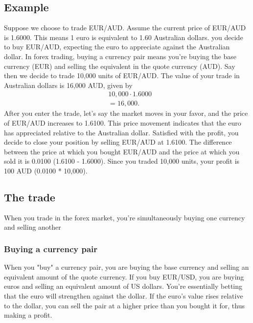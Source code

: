 \documentclass{report}
\begin{document}
    \subsection{Example}
    \bigbreak \noindent 
    Suppose we choose to trade EUR/AUD. Assume the current price of EUR/AUD is 1.6000. This means 1 euro is equivalent to 1.60 Australian dollars.
    \bigbreak \noindent 
    you decide to buy EUR/AUD, expecting the euro to appreciate against the Australian dollar. In forex trading, buying a currency pair means you're buying the base currency (EUR) and selling the equivalent in the quote currency (AUD).
    \bigbreak \noindent 
    Say then we decide to trade 10,000 units of EUR/AUD. The value of your trade in Australian dollars is 16,000 AUD, given by
    \begin{align*}
        &10,000 \cdot 1.6000 \\
        &=16,000
    .\end{align*}
    \bigbreak \noindent 
    After you enter the trade, let's say the market moves in your favor, and the price of EUR/AUD increases to 1.6100. This price movement indicates that the euro has appreciated relative to the Australian dollar.
    \bigbreak \noindent 
    Satisfied with the profit, you decide to close your position by selling EUR/AUD at 1.6100.
    The difference between the price at which you bought EUR/AUD and the price at which you sold it is 0.0100 (1.6100 - 1.6000). Since you traded 10,000 units, your profit is 100 AUD (0.0100 * 10,000).

    \bigbreak \noindent 
    \subsection{The trade}
    \bigbreak \noindent 
     When you trade in the forex market, you're simultaneously buying one currency and selling another
     \bigbreak \noindent 
     \subsubsection{Buying a currency pair}
     \bigbreak \noindent 
     When you "buy" a currency pair, you are buying the base currency and selling an equivalent amount of the quote currency.
     \bigbreak \noindent 
     If you buy EUR/USD, you are buying euros and selling an equivalent amount of US dollars. You're essentially betting that the euro will strengthen against the dollar. If the euro's value rises relative to the dollar, you can sell the pair at a higher price than you bought it for, thus making a profit.
     \bigbreak \noindent 
\end{document}

